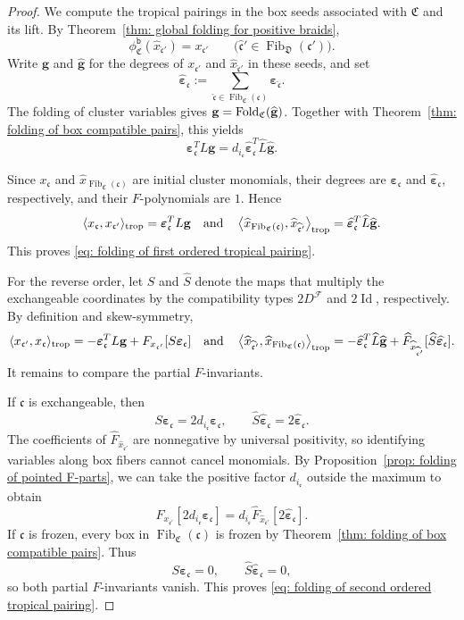 \documentclass[12pt, leqno]{amsart}
\numberwithin{equation}{section}
\theoremstyle{plain}
\theoremstyle{definition}
\newcommand{\seteq}{\mathbin{:=}}
\newcommand{\ve}{\boldsymbol{\varepsilon}}
\newcommand{\trop}{{\rm trop}}
\newcommand{\Fold}{{\rm Fold}}
\newcommand{\Fib}{\operatorname{Fib}}
\newcommand{\hx}{\widehat{x}}
\newcommand{\frakC}{\mathfrak{C}}
\newcommand{\frakD}{\mathfrak{D}}
\newcommand{\frakc}{\mathfrak{c}}
\newcommand{\hfrakc}{\widehat{\frakc}}
\newcommand{\bfg}{\mathbf{g}}
\newcommand{\calF}{\mathcal{F}}
\newcommand{\ttb}{\mathtt{b}}
\newcommand{\qtq}[1][{and}]{\quad\text{{#1}}\quad}
\begin{document}
\begin{proof}
We compute the tropical pairings in the box seeds associated with
\(\frakC\) and its lift.  By
Theorem~\ref{thm: global folding for positive braids},
\[
\phi_{\frakC}^{\ttb}(\hx_{\hfrakc'})=x_{\frakc'}
\qquad
\bigl(\hfrakc'\in\Fib_{\frakD}(\frakc')\bigr).
\]
Write \(\bfg\) and \(\widehat{\bfg}\) for the degrees of
\(x_{\frakc'}\) and \(\hx_{\hfrakc'}\) in these seeds, and set
\[
\widehat{\ve}_{\frakc}
\seteq
\sum_{\hfrakc\in\Fib_{\frakC}(\frakc)}\ve_{\hfrakc}.
\]
The folding of cluster variables gives
\(\bfg=\Fold_{\frakC}(\widehat{\bfg})\).
Together with
Theorem~\ref{thm: folding of box compatible pairs}, this yields
\[
\ve_{\frakc}^{T}L\bfg
=d_{i_{\frakc}}
\widehat{\ve}_{\frakc}^{T}\widehat L\widehat{\bfg}.
\]

Since \(x_{\frakc}\) and
\(\hx_{\Fib_{\frakC}(\frakc)}\) are initial cluster monomials,
their degrees are \(\ve_{\frakc}\) and
\(\widehat{\ve}_{\frakc}\), respectively, and their
\(F\)-polynomials are \(1\).  Hence
\[
\begin{aligned}
\langle x_{\frakc},x_{\frakc'}\rangle_{\trop}
=\ve_{\frakc}^{T}L\bfg \qtq 
\left\langle
\hx_{\Fib_{\frakC}(\frakc)},\hx_{\hfrakc'}
\right\rangle_{\trop}
=\widehat{\ve}_{\frakc}^{T}\widehat L\widehat{\bfg}.
\end{aligned}
\]
This proves \eqref{eq: folding of first ordered tropical pairing}.

For the reverse order, let \(S\) and \(\widehat S\) denote the
maps that multiply the exchangeable coordinates by the
compatibility types \(2D^{\calF}\) and \(2\operatorname{Id}\),
respectively.  By definition and skew-symmetry,
\[
\begin{aligned}
\langle x_{\frakc'},x_{\frakc}\rangle_{\trop}
=-\ve_{\frakc}^{T}L\bfg
  +F_{x_{\frakc'}}[S\ve_{\frakc}] \qtq 
\left\langle
\hx_{\hfrakc'},\hx_{\Fib_{\frakC}(\frakc)}
\right\rangle_{\trop}
=-\widehat{\ve}_{\frakc}^{T}\widehat L\widehat{\bfg}
  +\widehat F_{\hx_{\hfrakc'}}
     [\widehat S\widehat{\ve}_{\frakc}].
\end{aligned}
\]
It remains to compare the partial \(F\)-invariants. 

If \(\frakc\) is exchangeable, then
\[
S\ve_{\frakc}=2d_{i_{\frakc}}\ve_{\frakc},
\qquad
\widehat S\widehat{\ve}_{\frakc}
=2\widehat{\ve}_{\frakc}.
\]
The coefficients of \(\widehat F_{\hx_{\hfrakc'}}\) are nonnegative by
universal positivity, so identifying variables along box fibers
cannot cancel monomials.  By Proposition~\ref{prop: folding of pointed F-parts}, we can take the
positive factor \(d_{i_{\frakc}}\) outside the maximum to obtain 
\[
F_{x_{\frakc'}}[2d_{i_{\frakc}}\ve_{\frakc}]
=d_{i_{\frakc}}\widehat F_{\hx_{\hfrakc'}}
  [2\widehat{\ve}_{\frakc}].
\]
If \(\frakc\) is frozen, every box in
\(\Fib_{\frakC}(\frakc)\) is frozen by
Theorem~\ref{thm: folding of box compatible pairs}. Thus
\[
S\ve_{\frakc}=0,
\qquad
\widehat S\widehat{\ve}_{\frakc}=0,
\] 
so both partial \(F\)-invariants vanish. This proves
\eqref{eq: folding of second ordered tropical pairing}.


\end{proof}
\end{document}
